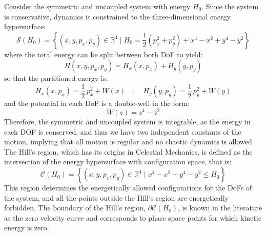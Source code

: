 \documentclass[10pt,aps,onecolumn,superscriptaddress]{revtex4-2}
\begin{document}
Consider the symmetric and uncoupled system with energy $H_0$. Since the system is conservative, dynamics is constrained to the three-dimensional energy hypersurface:
\begin{equation}
\mathcal{S}(H_0) = \left\{ (x,y,p_x,p_y) \in \mathbb{R}^4 \; | \; H_0 = \frac{1}{2}\left(p_x^2+p_y^2\right) + x^4 - x^2 + y^4 - y^2 \right\}
\end{equation} 
where the total energy can be split between both DoF to yield:
\begin{equation}\label{eqsymun}
H(x,y,p_x,p_y) = H_{x}(x,p_x) + H_{y}(y,p_y)
\end{equation}
so that the partitioned energy is:
\begin{equation}
H_{x}(x,p_x) = \frac{1}{2} \, p_x^2 + W(x) \quad,\quad H_{y}(y,p_y) = \frac{1}{2} \, p_y^2 + W(y)
\end{equation}
and the potential in each DoF is a double-well in the form:
\begin{equation}
W(z) = z^4 - z^2
\label{1D_potSymm}
\end{equation}
Therefore, the symmetric and uncoupled system is integrable, as the energy in each DOF is conserved, and thus we have two independent constants of the motion, implying that all motion is regular and no chaotic dynamics is allowed. The Hill's region, which has its origins in Celestial Mechanics, is defined as the intersection of the energy hypersurface with configuration space, that is:
\begin{equation}
\mathcal{C}(H_0) = \left\{ (x,y,p_x,p_y) \in \mathbb{R}^4 \; | \; x^4 - x^2 + y^4 - y^2 \leq H_0 \right\}
\end{equation}
This region determines the energetically allowed configurations for the DoFs of the system, and all the points outside the Hill's region are energetically forbidden. The boundary of the Hill's region, $\partial \mathcal{C}(H_0)$, is known in the literature as the zero velocity curve and corresponds to phase space points for which kinetic energy is zero.
\end{document}
